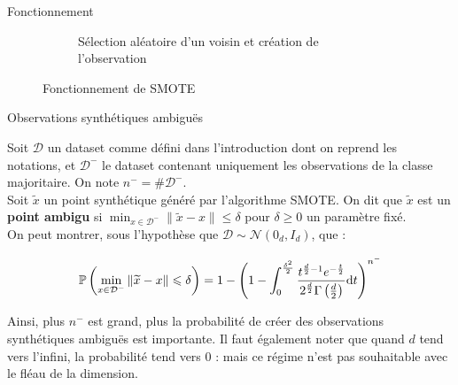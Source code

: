 \documentclass{beamer}
\begin{document}
\begin{frame}{}{Fonctionnement}
\begin{figure}[h!]
\begin{subfigure}[t]{.32\linewidth}
			\caption{Sélection aléatoire d'un voisin et création de l'observation}
		\end{subfigure}
		\caption{Fonctionnement de SMOTE}
	\end{figure}
\end{frame}



\begin{frame}{}{Observations synthétiques ambiguës}
	
	Soit $\mathcal{D}$ un dataset comme défini dans l'introduction dont on reprend les notations, et $\mathcal{D}^-$ le dataset contenant uniquement les observations de la classe majoritaire. On note $n^- = \#\mathcal{D}^-$.\\
	Soit $\widetilde{x}$ un point synthétique généré par l'algorithme SMOTE. On dit que $\widetilde{x}$ est un \textbf{point ambigu} si $\displaystyle \min_{x\in \mathcal{D}^-} \|\widetilde{x}-x\| \leqslant \delta$ pour $\delta \geqslant 0$ un paramètre fixé.\\
	
	On peut montrer, sous l'hypothèse que $\mathcal{D}\sim\mathcal{N}(0_d, I_d)$, que :
	
	\begin{equation*}
		\mathbb{P}\left(\displaystyle \min_{x\in \mathcal{D}^-} \|\widetilde{x}-x\| \leqslant \delta \right) = 1 - \left(1 - \int_0^{\frac{\delta^2}{2}} \frac{t^{\frac{d}{2}-1}e^{-\frac{t}{2}}}{2^{\frac{d}{2}}\Gamma\left(\frac{d}{2}\right)} \mathrm{d}t \right)^{n^-}
	\end{equation*}
	
	Ainsi, plus $n^-$ est grand, plus la probabilité de créer des observations synthétiques ambiguës est importante. Il faut également noter que quand $d$ tend vers l'infini, la probabilité tend vers 0 : mais ce régime n'est pas souhaitable avec le fléau de la dimension.
\end{frame}
\end{document}
